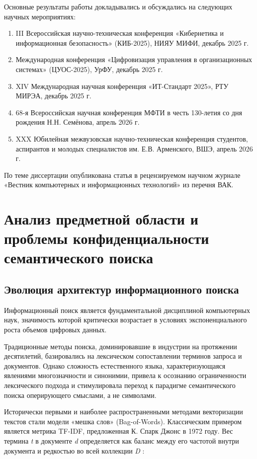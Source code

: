 \documentclass[a4paper, 12pt, oneside, openany]{article}
\newcounter{chap}
\newcommand{\chapsection}[1]{%
  \refstepcounter{chap}%
  \setcounter{equation}{0}%
  \setcounter{table}{0}%
  \setcounter{figure}{0}%
  \section{#1}%
}
\begin{document}
Основные результаты работы докладывались и обсуждались на следующих научных мероприятиях:
\begin{enumerate}
	\def\labelenumi{\arabic{enumi}.}
	\item
	III Всероссийская научно-техническая конференция «Кибернетика и информационная безопасность» (КИБ-2025), НИЯУ МИФИ, декабрь 2025 г.
	\item
	Международная конференция «Цифровизация управления в организационных системах» (ЦУОС-2025), УрФУ, декабрь 2025 г.
	\item
	XIV Международная научная конференция «ИТ-Стандарт 2025», РТУ МИРЭА, декабрь 2025 г.
	\item 
	68-я Всероссийская научная конференция МФТИ в честь 130-летия со дня рождения Н.Н. Семёнова, апрель 2026 г.
	\item 
	XXX Юбилейная межвузовская научно-техническая конференция студентов, аспирантов и молодых специалистов им. Е.В. Арменского, ВШЭ, апрель 2026 г.
\end{enumerate}

По теме диссертации опубликована статья в рецензируемом научном журнале «Вестник компьютерных и информационных технологий» из перечня ВАК.

\chapsection{Анализ предметной области и проблемы конфиденциальности семантического поиска}

\subsection{Эволюция архитектур информационного поиска}

Информационный поиск является фундаментальной дисциплиной компьютерных наук, значимость которой критически возрастает в условиях экспоненциального роста объемов цифровых данных.

Традиционные методы поиска, доминировавшие в индустрии на протяжении десятилетий, базировались на лексическом сопоставлении терминов запроса и документов. Однако сложность естественного языка, характеризующаяся явлениями многозначности и синонимии, привела к осознанию ограниченности лексического подхода и стимулировала переход к парадигме семантического поиска оперирующего смыслами, а не символами.

Исторически первыми и наиболее распространенными методами векторизации текстов стали модели «мешка слов» (Bag-of-Words). Классическим примером является метрика TF-IDF, предложенная К. Спарк Джонс в 1972 году. Вес термина \emph{t} в документе \emph{d} определяется как баланс между его частотой внутри документа и редкостью во всей коллекции \emph{D} \cite{ref14}:
\end{document}
